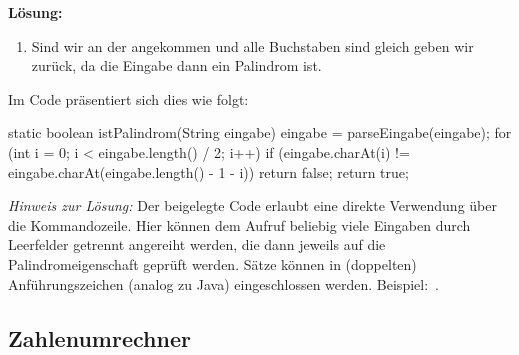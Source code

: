 \documentclass[table]{sopra-base}
\makeatletter
\newenvironment{solution}{\null\par\noindent\textbf{\textcolor{sob@col@uulm@cs}{Lösung:}}\newline\bgroup\color{black}\slshape\ignorespaces}{\egroup}
\makeatother
\begin{document}
\begin{solution}
\begin{enumerate}[nolistsep]
        \item Sind wir an der  angekommen und alle Buchstaben sind gleich geben wir  zurück, da die Eingabe dann ein Palindrom ist.
    \end{enumerate}
    Im Code präsentiert sich dies wie folgt:
    {\upshape
    \begin{java}[firstnumber=34]
static boolean istPalindrom(String eingabe) {
    eingabe = parseEingabe(eingabe);
    for (int i = 0; i < eingabe.length() / 2; i++) {
        if (eingabe.charAt(i) != eingabe.charAt(eingabe.length() - 1 - i))
            return false;
    }
    return true;
}
    \end{java}
    }
    \textit{Hinweis zur Lösung:} Der beigelegte Code erlaubt eine direkte Verwendung über die Kommandozeile. Hier können dem Aufruf  beliebig viele Eingaben durch Leerfelder getrennt angereiht werden, die dann jeweils auf die Palindromeigenschaft geprüft werden. Sätze können in (doppelten) Anführungszeichen (analog zu Java) eingeschlossen werden. Beispiel:
    \,.
\end{solution}

\subsection{Zahlenumrechner}
\end{document}
